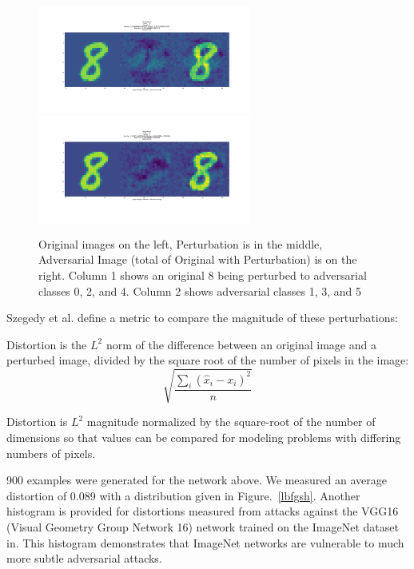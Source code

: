 \begin{figure}[ht]
\includegraphics[trim=200 185 100 200, clip,width=7cm]{c1_figures/FC200-200-10-2448-O8-A4-attack_summary.png}\includegraphics[trim=200 185 100 200, clip,width=7cm]{c1_figures/FC200-200-10-2448-O8-A5-attack_summary.png}
\caption{Original images on the left, Perturbation is in the middle, Adversarial Image (total of Original with Perturbation) is on the right. Column 1 shows an original 8 being perturbed to adversarial classes 0, 2, and 4. Column 2 shows adversarial classes 1, 3, and 5}
\label{lbfgsa}
\end{figure}
Szegedy et al. define a metric to compare the magnitude of these perturbations:
\begin{definition}{Distortion is the $L^2$ norm of the difference between an original image and a perturbed image, divided by the square root of the number of pixels in the image: }
\[\sqrt{\dfrac{\sum_i  (\hat x_i - x_i)^2}{n}}\]
\end{definition}
Distortion is $L^2$ magnitude normalized by the square-root of the number of dimensions so that values can be compared for modeling problems with differing numbers of pixels. 

900 examples were generated for the network above. We measured an
average distortion of 0.089 with a distribution given in
Figure.~\ref{lbfgsh}. Another histogram is provided for distortions
measured from attacks against the VGG16 (Visual Geometry Group
Network 16) network trained on the ImageNet dataset
in\label{lbfgsi}. This histogram demonstrates that ImageNet networks
are vulnerable to much more subtle adversarial attacks. 

